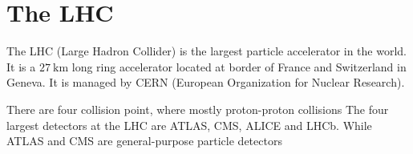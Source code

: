 \section{The LHC}

The LHC (Large Hadron Collider) is the largest particle accelerator in the world.
It is a $\qty{27}{\kilo\meter}$ long ring accelerator located at border of France and Switzerland in Geneva. 
It is managed by CERN (European Organization for Nuclear Research).

There are four collision point, where mostly proton-proton collisions
The four largest detectors at the LHC are ATLAS, CMS, ALICE and LHCb.
While ATLAS and CMS are general-purpose particle detectors
